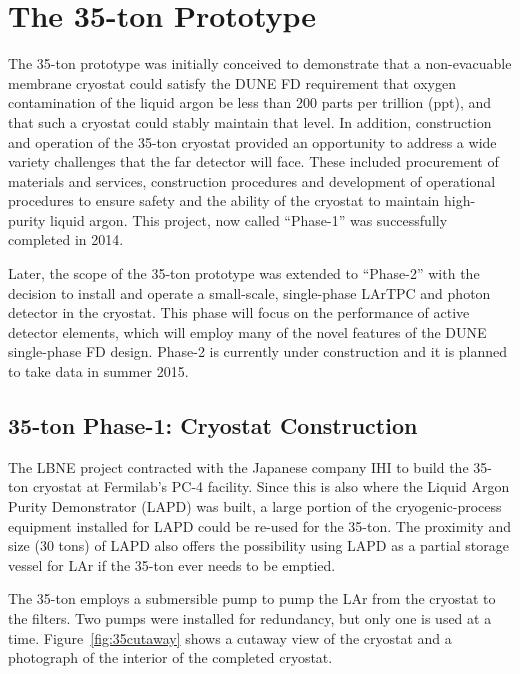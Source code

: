 \section{The 35-ton Prototype} 
\label{sec:proto-35t}

The 35-ton prototype was initially conceived to demonstrate that a non-evacuable
membrane cryostat could satisfy the DUNE FD requirement that oxygen contamination
of the liquid argon be less than 200 parts per trillion (ppt), and that such a cryostat
could stably maintain that level.
%
In addition, construction and operation of the 
35-ton cryostat provided an opportunity to address 
a wide variety challenges that the far detector will face.
These included procurement of materials and services, 
construction procedures and development of operational procedures
to ensure safety and the ability of the 
cryostat to maintain high-purity liquid argon. 
This project, now called ``Phase-1'' was successfully completed in 2014.

Later, the scope of the 35-ton prototype was extended to ``Phase-2'' with the 
decision to install and operate a small-scale, single-phase
LArTPC and photon detector in the cryostat.
This phase will focus on the performance 
of active detector elements, which will employ many of the
novel features of the DUNE single-phase FD design. 
Phase-2 is currently under construction and it is planned to take data in summer 2015.

\subsection{35-ton Phase-1: Cryostat Construction}

The LBNE project contracted with the Japanese company IHI\cite{bib:ihicorp}
to build the 35-ton cryostat at Fermilab's PC-4 facility.
Since this is also where the Liquid Argon Purity Demonstrator (LAPD)
\cite{bib:lapdP07005}
was built, a large portion of the cryogenic-process 
equipment installed for LAPD could be re-used for the 35-ton.
The proximity and size (30 tons) of LAPD also offers the possibility using LAPD as 
a partial storage vessel for LAr if the 35-ton ever needs to be emptied.

The 35-ton employs a submersible %
pump to pump the LAr from the cryostat to the filters. 
Two pumps were installed for 
redundancy, but only one is used at a time.
Figure~\ref{fig:35cutaway} shows a cutaway view of the cryostat and a photograph of the interior
of the completed cryostat. 

